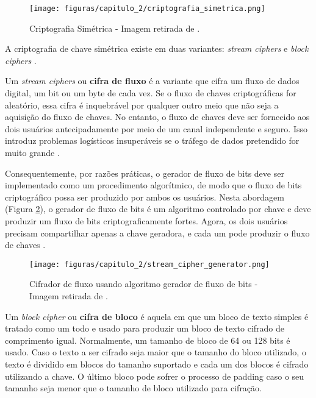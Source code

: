             \begin{figure}[h]
                 \centering
                 \texttt{[image: figuras/capitulo\_2/criptografia\_simetrica.png]}
                 \caption{Criptografia Simétrica - Imagem retirada de \cite{beginnig_blockchain_bikramaditya}.}
                 \label{fig:imagem_criptografia_simetrica}
            \end{figure}
            
            A criptografia de chave simétrica existe em duas variantes: \textit{stream ciphers} e \textit{block ciphers} \cite{beginnig_blockchain_bikramaditya}.
            
            Um \textit{stream ciphers} ou \textbf{cifra de fluxo} é a variante que cifra um fluxo de dados digital, um bit ou um byte de cada vez. Se o fluxo de chaves criptográficas for aleatório, essa cifra é inquebrável por qualquer outro meio que não seja a aquisição do fluxo de chaves. No entanto, o fluxo de chaves deve ser fornecido aos dois usuários antecipadamente por meio de um canal independente e seguro. Isso introduz problemas logísticos insuperáveis se o tráfego de dados pretendido for muito grande \cite{cryptograpy_and_network_stallings}.
            
            Consequentemente, por razões práticas, o gerador de fluxo de bits deve ser implementado como um procedimento algorítmico, de modo que o fluxo de bits criptográfico possa ser produzido por ambos os usuários. Nesta abordagem (Figura \ref{fig:imagem_stream_cipher}), o gerador de fluxo de bits é um algoritmo controlado por chave e deve produzir um fluxo de bits criptograficamente fortes. Agora, os dois usuários precisam compartilhar apenas a chave geradora, e cada um pode produzir o fluxo de chaves \cite{cryptograpy_and_network_stallings}.
        
            
                \begin{figure}[h]
                     \centering
                     \texttt{[image: figuras/capitulo\_2/stream\_cipher\_generator.png]}
                     \caption{Cifrador de fluxo usando algoritmo gerador de fluxo de bits - Imagem retirada de \cite{cryptograpy_and_network_stallings}.}
                     \label{fig:imagem_stream_cipher}
                \end{figure}
        
            Um \textit{block cipher} ou \textbf{cifra de bloco} é aquela em que um bloco de texto simples é tratado como um todo e usado para produzir um bloco de texto cifrado de comprimento igual. Normalmente, um tamanho de bloco de 64 ou 128 bits é usado. Caso o texto a ser cifrado seja maior que o tamanho do bloco utilizado, o texto é dividido em blocos do tamanho suportado e cada um dos blocos é cifrado utilizando a chave. O último bloco pode sofrer o processo de padding caso o seu tamanho seja menor que o tamanho de bloco utilizado para cifração.
            
